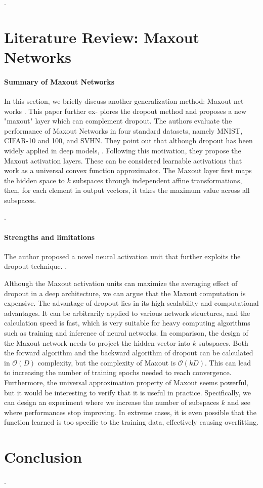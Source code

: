 \documentclass{article}
\begin{document}
\questionFifteen.


\section{Literature Review: Maxout Networks}
\label{sec:task3}

\paragraph{Summary of Maxout Networks} In this section, we
briefly discuss another generalization method: Maxout net-
works \cite{goodfellow2013maxout}. This paper further ex-
plores the dropout method and proposes a new "maxout" layer
 which can complement dropout.
The authors evaluate the performance of Maxout Networks
in four standard datasets, namely MNIST, CIFAR-10
and 100, and SVHN. They point out that although
dropout has been widely applied in deep models, \questionSixteen. Following this 
motivation, they propose the Maxout activation layers. These can be considered learnable activations that work as a universal convex function approximator. The Maxout layer first
maps the hidden space to $k$ subspaces through independent
affine transformations, then, for each element in output
vectors, it takes the maximum value across all subspaces.

\questionSeventeen.

\paragraph{Strengths and limitations} The author proposed a novel
neural activation unit that further exploits the dropout technique.
\questionEighteen.

Although the Maxout activation units can maximize
the averaging effect of dropout in a deep architecture,
we can argue that the Maxout computation
is expensive. The advantage of dropout lies in its high 
scalability and computational advantages. It can be arbitrarily
applied to various network structures, and the calculation
speed is fast, which is very suitable for heavy computing 
algorithms such as training and inference of neural networks.
In comparison, the design of the Maxout network needs to project the
hidden vector into $k$ subspaces. Both the forward algorithm and the
backward algorithm of dropout can be calculated in $\mathcal{O}(D)$
complexity, but the complexity of Maxout is $\mathcal{O}(kD)$.
This can lead to increasing the number of training epochs needed
to reach convergence. 
Furthermore, the universal approximation property of Maxout seems
powerful, but it would be interesting to verify that it is useful
in practice. Specifically, we can design an experiment where we 
increase the number of subspaces $k$ and see where performances stop
improving. In extreme cases, it is even possible that the 
function learned is too specific to the training data, effectively
causing overfitting.



\section{Conclusion}
\label{sec:concl}
    
\questionNineteen.


\end{document}
